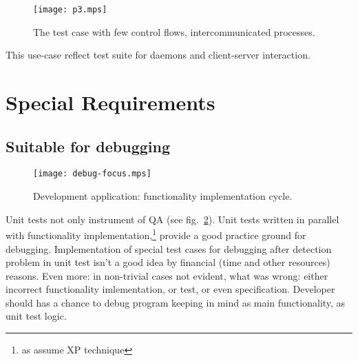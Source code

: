 \documentclass[a4paper,twoside]{article}
\begin{document}
\begin{figure}
  \begin{center}
  \texttt{[image: p3.mps]}
  \end{center}
  \caption{The test case with few control flows, intercommunicated processes.\label{IntercomProcesses}}
\end{figure}

This use-case reflect test suite for daemons and client-server interaction.

\section{Special Requirements}


\subsection{Suitable for debugging}

\begin{figure}
  \begin{center}
  \texttt{[image: debug-focus.mps]}
  \end{center}
  \caption{Development application: functionality implementation cycle.\label{DevCycle}}
\end{figure}

Unit tests not only instrument of QA (see fig.~\ref{DevCycle}).
Unit tests written
in parallel with functionality implementation,\footnote{as assume XP technique}
provide a good practice ground
for debugging. Implementation of special test cases for debugging
after detection problem in unit test isn't a good idea by financial (time and other resources) reasons.
Even more: in non-trivial cases not evident, what was wrong:
either incorrect functionality imlementation, or test, or even
specification. Developer should has a chance to debug program
keeping in mind as main functionality, as unit test logic.
\end{document}
